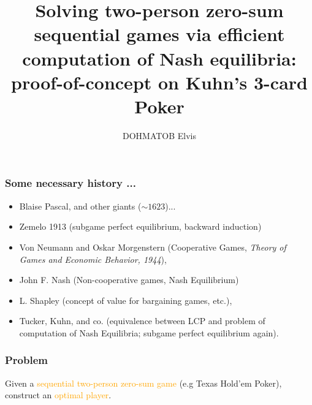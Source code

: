 \documentclass[xcolor=dvipsnames]{beamer}
\title[NeuroBreakfast - \today\hspace{\stretch{1}}
  (\insertframenumber{}/\inserttotalframenumber{})]{Solving two-person zero-sum sequential games
via efficient computation of Nash equilibria: proof-of-concept on Kuhn's 3-card Poker}
\author{DOHMATOB Elvis \inst{1,2}}
\institute{
  \inst{1}Parietal Team, INRIA\\\inst{2}Universit\'e Paris-Sud}
\date{} \selectlanguage{english}
\def\B#1{\bm{#1}}
\def\trans{^\mathsf{T}}
\begin{document}
\begin{frame}
\maketitle
\end{frame}

\begin{frame}
\frametitle{Some necessary history ...}
\begin{itemize}[<+->]
  \item Blaise Pascal, and other giants ($\sim 1623$)...
    \item Zemelo 1913 (subgame perfect equilibrium, backward induction)
    \item Von Neumann and Oskar Morgenstern (Cooperative Games, \textit{Theory of Games and Economic Behavior, 1944}),
    \item John F. Nash (Non-cooperative games, Nash Equilibrium)
    \item L. Shapley (concept of value for bargaining games, etc.),
    \item Tucker, Kuhn, and co. (equivalence between LCP and problem of computation of Nash Equilibria;
      subgame perfect equilibrium again).
\end{itemize}
\end{frame}

\begin{frame}
  \frametitle{Problem}
  Given a \textcolor{orange}{sequential two-person zero-sum game} (e.g Texas Hold'em Poker), construct an \textcolor{orange}{optimal player}.



\end{frame}
\end{document}
